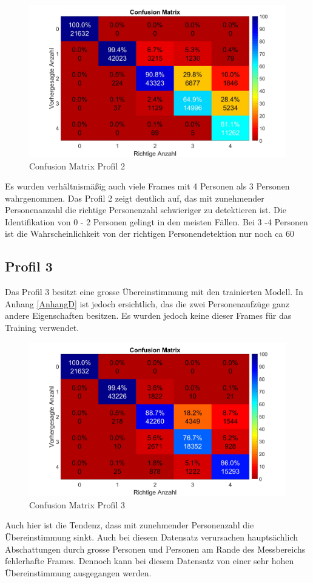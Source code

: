 \begin{figure}[H]
	\centering
		\label{fig:profil2}
	\includegraphics[width=0.5\linewidth]{fig/Profil_2m}
	\caption[Confusion Matrix Profil 2]{Confusion Matrix Profil 2}

\end{figure}
 Es wurden verhältnismäßig auch viele Frames mit 4 Personen als 3 Personen wahrgenommen. Das Profil 2 zeigt deutlich auf, das mit zunehmender Personenanzahl die richtige Personenzahl schwieriger zu detektieren ist. Die Identifikation von 0 - 2 Personen gelingt in den meisten Fällen. Bei 3 -4 Personen ist die Wahrscheinlichkeit von der richtigen Personendetektion nur noch ca 60%

\subsection{Profil 3}
\label{subsec:Profil3}
Das Profil 3 besitzt eine grosse Übereinstimmung mit den trainierten Modell. In Anhang \ref{AnhangD} ist jedoch ersichtlich, das die zwei  Personenaufzüge ganz andere Eigenschaften besitzen. Es wurden jedoch keine dieser Frames für das Training verwendet.

\begin{figure}[H]
	\centering
	\includegraphics[width=0.5\linewidth]{fig/Profil_3m}
	\caption[Confusion Matrix Profil 3]{Confusion Matrix Profil 3}
		\label{fig:profil3}
\end{figure}

Auch hier ist die Tendenz, dass mit zunehmender Personenzahl die Übereinstimmung sinkt. Auch bei diesem Datensatz verursachen hauptsächlich Abschattungen durch grosse Personen und Personen am Rande des Messbereichs fehlerhafte Frames. Dennoch kann bei diesem Datensatz von einer sehr hohen Übereinstimmung  ausgegangen werden.

